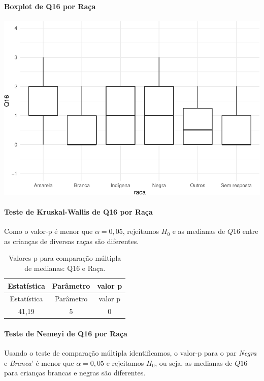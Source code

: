 \documentclass[]{article}
\let\oldparagraph\paragraph
\renewcommand{\paragraph}[1]{\oldparagraph{#1}\mbox{}}
\begin{document}
\hypertarget{boxplot-de-q16-por-rauxe7a}{%
\paragraph{Boxplot de Q16 por Raça}\label{boxplot-de-q16-por-rauxe7a}}

\begin{center}\includegraphics[width=0.75\linewidth]{relatorio_files/figure-latex/unnamed-chunk-161-1} \end{center}

\hypertarget{teste-de-kruskal-wallis-de-q16-por-rauxe7a}{%
\paragraph{Teste de Kruskal-Wallis de Q16 por Raça}\label{teste-de-kruskal-wallis-de-q16-por-rauxe7a}}

Como o valor-p é menor que \(\alpha=0,05\), rejeitamos \(H_0\) e as medianas de \(Q16\) entre as crianças de diversas raças são diferentes.

\begin{longtable}[]{@{}ccc@{}}
\caption{\label{tab:unnamed-chunk-162}Valores-p para comparação múltipla de medianas: Q16 e Raça.}\tabularnewline
\toprule
Estatística & Parâmetro & valor p\tabularnewline
\midrule
\endfirsthead
\toprule
Estatística & Parâmetro & valor p\tabularnewline
\midrule
\endhead
41,19 & 5 & 0\tabularnewline
\bottomrule
\end{longtable}

\hypertarget{teste-de-nemeyi-de-q16-por-rauxe7a}{%
\paragraph{Teste de Nemeyi de Q16 por Raça}\label{teste-de-nemeyi-de-q16-por-rauxe7a}}

Usando o teste de comparação múltipla identificamos, o valor-p para o par \emph{Negra} e \emph{Branca}' é menor que \(\alpha=0,05\) e rejeitamos \(H_0\), ou seja, as medianas de \(Q16\) para crianças brancas e negras são diferentes.
\end{document}
